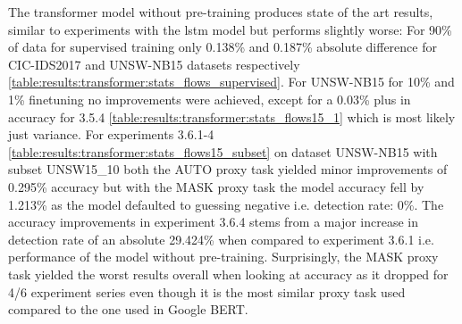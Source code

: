 The transformer model without pre-training produces state of the art results, similar to experiments with the \gls{lstm} model but  performs slightly worse: For 90\% of data for supervised training only 0.138\% and 0.187\% absolute difference for CIC-IDS2017 and UNSW-NB15 datasets respectively \ref{table:results:transformer:stats_flows_supervised}.
For UNSW-NB15 for 10\% and 1\% finetuning no improvements were achieved, except for a 0.03\% plus in accuracy for 3.5.4 \ref{table:results:transformer:stats_flows15_1} which is most likely just variance.
For experiments 3.6.1-4 \ref{table:results:transformer:stats_flows15_subset} on dataset UNSW-NB15 with subset UNSW15\_10 both the AUTO proxy task yielded minor improvements of 0.295\% accuracy but with the MASK proxy task the model accuracy fell by 1.213\% as the model defaulted to guessing negative i.e. detection rate: 0\%. The accuracy improvements in experiment 3.6.4 stems from a major increase in detection rate of an absolute 29.424\% when compared to experiment 3.6.1 i.e. performance of the model without pre-training.
Surprisingly, the MASK proxy task yielded the worst results overall when looking at accuracy as it dropped for 4/6 experiment series even though it is the most similar proxy task used compared to the one used in Google BERT.























